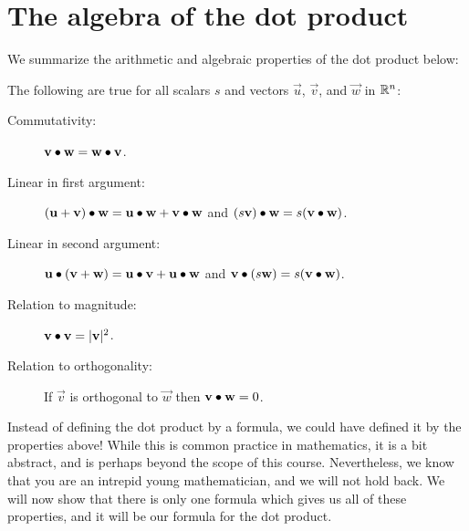 \documentclass{ximera}
\begin{document}
\section{The algebra of the dot product}

We summarize the arithmetic and algebraic properties of the dot
product below:
\begin{theorem}
  The following are true for all scalars $s$ and vectors
  $\vec{u}$, $\vec{v}$, and $\vec{w}$ in $\mathbb R^n$:
  \begin{description}
  \item[Commutativity:] $\mathbf{v} \bullet \mathbf{w} = \mathbf{w} \bullet
    \mathbf{v}$.
  \item[Linear in first argument:] $(\mathbf{u}+\mathbf{v})\bullet \mathbf{w} = \mathbf{u}\bullet \mathbf{w} +
    \mathbf{v}\bullet \mathbf{w}$ and $(s\mathbf{v})\bullet \mathbf{w} = s(\mathbf{v}
    \bullet \mathbf{w})$.
  \item[Linear in second argument:] $\mathbf{u} \bullet (\mathbf{v}+\mathbf{w}) = \mathbf{u}\bullet \mathbf{v}+
    \mathbf{u}\bullet \mathbf{w}$ and $\mathbf{v} \bullet (s\mathbf{w}) = s(\mathbf{v}
    \bullet \mathbf{w})$.
  \item[Relation to magnitude:] $\mathbf{v} \bullet \mathbf{v} = |\mathbf{v}|^2$.
  \item[Relation to orthogonality:] If $\vec{v}$ is orthogonal to
    $\vec{w}$ then $\mathbf{v} \bullet \mathbf{w} = 0$.
  \end{description}
\end{theorem}

Instead of defining the dot product by a formula, we could have
defined it by the properties above!  While this is common practice in
mathematics, it is a bit abstract, and is perhaps beyond the scope of
this course. Nevertheless, we know that you are an intrepid young
mathematician, and we will not hold back.  We will now show that there
is only one formula which gives us all of these properties, and it
will be our formula for the dot product.
\end{document}
